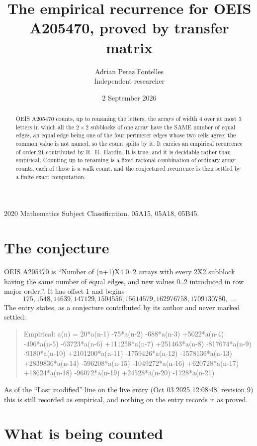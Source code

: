 \documentclass[11pt,a4paper]{article}
\title{The empirical recurrence for OEIS A205470, proved by transfer matrix}
\author{Adrian Perez Fontelles\\ \small Independent researcher}
\date{2 September 2026}
\theoremstyle{plain}
\theoremstyle{definition}
\begin{document}
\maketitle

\begin{abstract}
OEIS A205470 counts, up to renaming the letters, the arrays of width $4$ over at most $3$
letters in which all the $2\times2$ subblocks of one array have the SAME number of equal edges, an equal edge being one of the four perimeter edges whose two cells agree; the common value is not named, so the count splits by it. It carries an empirical recurrence of order $21$ contributed by
R.~H.~Hardin. It is true, and it is decidable rather than empirical. Counting up to renaming is
a fixed rational combination of ordinary array counts, each of those is a walk count, and the
conjectured recurrence is then settled by a finite exact computation.
\end{abstract}

\noindent\small 2020 Mathematics Subject Classification. 05A15, 05A18, 05B45.\normalsize

\section{The conjecture}

OEIS A205470 is ``Number of (n+1)X4 0..2 arrays with every 2X2 subblock having the same number of equal edges, and new values 0..2 introduced in row major order.''. It has offset $1$ and begins
\[
175, 1548, 14639, 147129, 1504556, 15614579, 162976758, 1709130780,\ \dots
\]
The entry states, as a conjecture contributed by its author and never marked settled:
\begin{quote}
Empirical: a(n) = 20*a(n-1) -75*a(n-2) -688*a(n-3) +5022*a(n-4) -496*a(n-5) -63723*a(n-6) +111258*a(n-7) +251463*a(n-8) -817674*a(n-9) -9180*a(n-10) +2101200*a(n-11) -1759426*a(n-12) -1578136*a(n-13) +2839836*a(n-14) -596208*a(n-15) -1049272*a(n-16) +620728*a(n-17) +18624*a(n-18) -96072*a(n-19) +24528*a(n-20) -1728*a(n-21)
\end{quote}
As of the ``Last modified'' line on the live entry (Oct 03 2025 12:08:48, revision 9) this is still
recorded as empirical, and nothing on the entry records it as proved.

\section{What is being counted}
\end{document}
